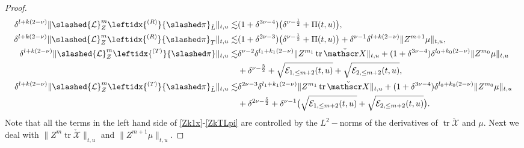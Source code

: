 \documentclass[11pt,twoside]{article}
\def \no{\nonumber}
\def\f{\frac}
\begin{document}
\begin{proof}
\begin{align}
\delta^{l+k(2-\nu)}\|\slashed{\mathcal L}_Z^{m}\leftidx{^{(R)}}{\slashed\pi}_{\mathring L}\|_{t,u}\lesssim&(1+\delta^{3\nu-4})\bigl(\delta^{\nu-\f12}+\Pi(t,u)\bigr),\label{ZkRLp}\\
\delta^{l+k(2-\nu)}\|\slashed{\mathcal L}_Z^{m}\leftidx{^{(R)}}{\slashed\pi}_T\|_{t,u}\lesssim&(1+\delta^{2\nu-3})\bigl(\delta^{\nu-\f12}+\Pi(t,u)\bigr)+\delta^{\nu-1}\delta^{l+k(2-\nu)} \| Z^{m+1}\mu \|_{t,u},\label{ZkRLpi}\\
\delta^{l+k(2-\nu)}\|\slashed{\mathcal L}_Z^m\leftidx{^{(T)}}{\slashed\pi}\|_{t,u}\lesssim&\delta^{\nu-2}\delta^{l_1+k_1(2-\nu)}\|Z^{m_1}\operatorname{tr}\check{\mathscr X}\|_{t,u}+(1+\delta^{3\nu-4})\delta^{l_0+k_0(2-\nu)} \| Z^{m_0}\mu \|_{t,u}\no\\
&+\delta^{\nu-\f32}
+\sqrt{\mathcal{E}_{1,\leq m+2}(t,u)} + \sqrt{\mathcal{E}_{2,\leq m+2}(t,u)} ,\label{ZkTpi}\\
\delta^{l+k(2-\nu)}\|\slashed{\mathcal L}_Z^m\leftidx{^{(T)}}{\slashed\pi}_{\mathring L}\|_{t,u}\lesssim&\delta^{2\nu-3}\delta^{l_1+k_1(2-\nu)}\|Z^{m_1}\operatorname{tr}\check{\mathscr X}\|_{t,u}+(1+\delta^{3\nu-4})\delta^{l_0+k_0(2-\nu)} \| Z^{m_0}\mu \|_{t,u}\no\\
&+\delta^{2\nu-\f52}
+\delta^{\nu-1}\bigl(\sqrt{\mathcal{E}_{1,\leq m+2}(t,u)} + \sqrt{\mathcal{E}_{2,\leq m+2}(t,u)}\bigr).\label{ZkTLpi}
\end{align}
Note that all the terms in the left hand side of \eqref{Zk1x}-\eqref{ZkTLpi} are controlled by the $L^2-$norms of
the derivatives of $\operatorname{tr}{\check{\mathscr X}}$ and $\mu$.
Next we deal with $\|Z^{m}\operatorname{tr}{\check{\mathscr X}}\|_{t,u}$ and $\|Z^{m+1}\mu\|_{t,u}$.


\end{proof}
\end{document}
